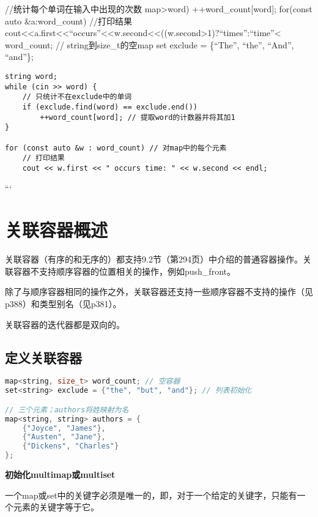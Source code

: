 \documentclass[
  a4paper,
  oneside,tablecaptionabove
]{scrbook}
\begin{document}
//统计每个单词在输入中出现的次数 map\textgreater{}word)
++word\_count{[}word{]}; for(const auto \&a:word\_count) //打印结果
cout\textless{}\textless{}a.first\textless{}\textless{}\enquote{occurs}\textless{}\textless{}w.second\textless{}\textless{}((w.second\textgreater{}1)?\enquote{times}:\enquote{time}\textless{}
word\_count; // string到size\_t的空map set exclude = \{\enquote{The},
\enquote{the}, \enquote{And}, \enquote{and}\};

\begin{lstlisting}
string word;
while (cin >> word) {
    // 只统计不在exclude中的单词
    if (exclude.find(word) == exclude.end())
        ++word_count[word]; // 提取word的计数器并将其加1
}

for (const auto &w : word_count) // 对map中的每个元素
    // 打印结果
    cout << w.first << " occurs time: " << w.second << endl;
\end{lstlisting}

```

\section{关联容器概述}\label{ux5173ux8054ux5bb9ux5668ux6982ux8ff0}

关联容器（有序的和无序的）都支持9.2节（第294页）中介绍的普通容器操作。关联容器不支持顺序容器的位置相关的操作，例如push\_front。

除了与顺序容器相同的操作之外，关联容器还支持一些顺序容器不支持的操作（见p388）和类型别名（见p381）。

关联容器的迭代器都是双向的。

\subsection{定义关联容器}\label{ux5b9aux4e49ux5173ux8054ux5bb9ux5668}

\begin{lstlisting}[language={C++}]
map<string, size_t> word_count; // 空容器
set<string> exclude = {"the", "but", "and"}; // 列表初始化

// 三个元素；authors将姓映射为名
map<string, string> authors = {
    {"Joyce", "James"},
    {"Austen", "Jane"},
    {"Dickens", "Charles"}
};
\end{lstlisting}

\textbf{初始化multimap或multiset}

一个map或set中的关键字必须是唯一的，即，对于一个给定的关键字，只能有一个元素的关键字等于它。
\end{document}
